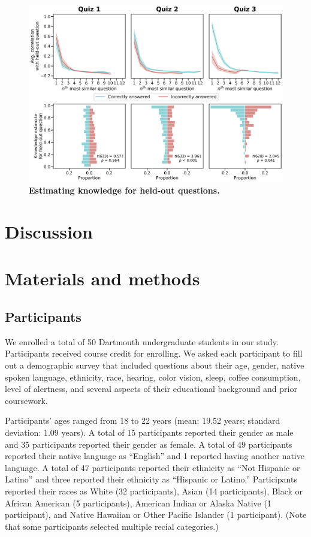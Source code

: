 \documentclass[10pt]{article}
\begin{document}
\begin{figure}[tp]
    \centering
    \includegraphics[width=\textwidth]{figs/held-out-question-analyses}
    
    \caption{\textbf{Estimating knowledge for held-out questions.}}
    
    \label{fig:predictions}
\end{figure}

\section*{Discussion}

\section*{Materials and methods}

\subsection*{Participants}

We enrolled a total of 50 Dartmouth undergraduate students in our study.
Participants received course credit for enrolling. We asked each participant to
fill out a demographic survey that included questions about their age, gender,
native spoken language, ethnicity, race, hearing, color vision, sleep, coffee
consumption, level of alertness, and several aspects of their educational
background and prior coursework.

Participants' ages ranged from 18 to 22 years (mean: 19.52 years;
standard deviation: 1.09 years). A total of 15 participants reported
their gender as male and 35 participants reported their gender as
female. A total of 49 participants reported their native language as
``English'' and 1 reported having another native language. A total of
47 participants reported their ethnicity as ``Not Hispanic or Latino''
and three reported their ethnicity as ``Hispanic or Latino.''
Participants reported their races as White (32 participants), Asian
(14 participants), Black or African American (5 participants),
American Indian or Alaska Native (1 participant), and Native Hawaiian or
Other Pacific Islander (1 participant). (Note that some participants
selected multiple recial categories.)
\end{document}
